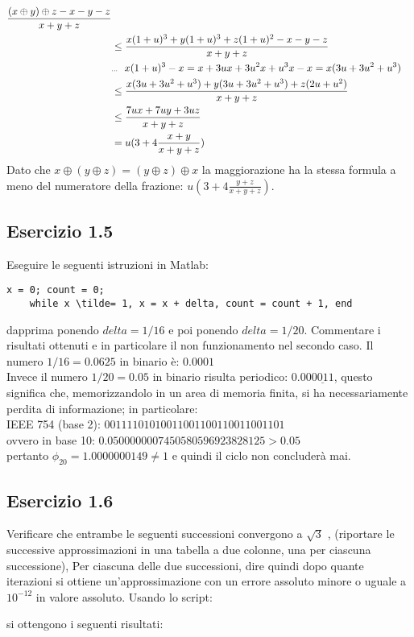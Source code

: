 \begin{equation*}
	\begin{split}
		\frac{(x \oplus y) \oplus z - x - y - z}{x+y+z} \\
			& \leq \frac{x(1+u)^3 + y(1+u)^3 + z(1+u)^2 -x -y -z}{x+y+z} \\
			& \tiny{\text{...} \quad x(1+u)^3 - x = x+3ux+3u^2x+u^3x-x = x(3u+3u^2+u^3)} \\
	 		& \leq \frac{x(3u+3u^2+u^3) + y(3u+3u^2+u^3) + z(2u+u^2)}{x+y+z} \\
	 		& \leq \frac{7ux+7uy+3uz}{x+y+z} \\
	 		& = u(3+4 \frac{x+y}{x+y+z})
	\end{split}
\end{equation*}
Dato che $x \oplus (y \oplus z) = (y \oplus z) \oplus x$ la maggiorazione ha la stessa formula a meno del numeratore della frazione: $ u(3+4 \frac{y+z}{x+y+z})$.

	\subsection{Esercizio 1.5}
Eseguire le seguenti istruzioni in Matlab:
\begin{lstlisting}[frame=single]
	x = 0; count = 0;	
	while x \tilde= 1, x = x + delta, count = count + 1, end
\end{lstlisting}
dapprima ponendo $delta = 1/16$ e poi ponendo $delta = 1/20$. Commentare i risultati ottenuti e in particolare il non funzionamento nel secondo caso.
\PP
Il numero $1/16 = 0.0625$ in binario è: $0.0001$\\
Invece il numero $1/20 = 0.05$ in binario risulta periodico: $0.00\underline{0011}$, questo significa che, memorizzandolo in un area di memoria finita, si ha necessariamente perdita di informazione; in particolare:\\
IEEE 754 (base 2): $00111101010011001100110011001101$\\
ovvero in base 10: $0.0500000007450580596923828125 > 0.05$\\
pertanto $\phi_{20} = 1.0000000149 \neq 1$ e quindi il ciclo non concluderà mai.

	\subsection{Esercizio 1.6}
Verificare che entrambe le seguenti successioni convergono a $\sqrt{3}$ , (riportare le successive approssimazioni in una tabella a due colonne, una per ciascuna successione),
Per ciascuna delle due successioni, dire quindi dopo quante iterazioni si ottiene un’approssimazione con un errore assoluto minore o uguale a $10^{-12}$ in valore assoluto.
\PP
Usando lo script:

si ottengono i seguenti risultati:

